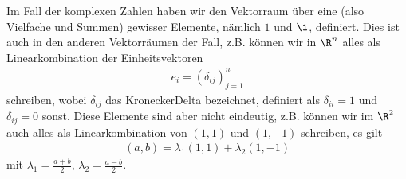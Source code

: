 \documentclass[letterpaper,10pt,english]{jupyterBook}
\begin{document}
Im Fall der komplexen Zahlen haben wir den Vektorraum über eine  (also Vielfache und Summen) gewisser Elemente, nämlich \(1\) und \(\i\), definiert. Dies ist auch in den anderen Vektorräumen der Fall, z.B. können wir in \(\R^n\) alles als Linearkombination der Einheitsvektoren
\begin{equation*}
\begin{split} e_i = (\delta_{ij})_{j=1}^n\end{split}
\end{equation*}
schreiben, wobei \(\delta_{ij}\) das Kronecker\sphinxhyphen{}Delta bezeichnet, definiert als \(\delta_{ii}=1\) und \(\delta_{ij}=0\) sonst. Diese Elemente sind aber nicht eindeutig, z.B. können wir im \(\R^2\) auch alles als Linearkombination von \((1,1)\) und \((1,-1)\) schreiben, es gilt
\begin{equation*}
\begin{split} (a,b) = \lambda_1 (1,1) + \lambda_2 (1,-1)\end{split}
\end{equation*}
mit \(\lambda_1 = \frac{a+b}2\), \(\lambda_2 = \frac{a-b}2\).
\label{vektorraeume/vektorraeume:definition-5}
\end{document}
